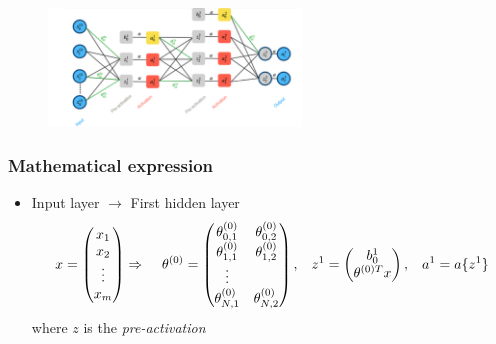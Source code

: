 \documentclass[a4paper,10pt]{article}
\begin{document}
\begin{figure}[ht]
    \centering
    \includegraphics[width =0.6\textwidth]{FNN.png}
\end{figure}

\subsubsection{Mathematical expression}
\begin{itemize}
    \item Input layer $\rightarrow$ First hidden layer
        \begin{gather*}
            x  = 
            \begin{pmatrix}
                x_{1} \\
                x_{2} \\
                \vdots \\
                x_{m} \\
            \end{pmatrix}
            \Rightarrow\hspace*{0.4cm}\theta^{(0)} = 
            \begin{pmatrix}
                \theta_{0,1}^{(0)} & \theta_{0,2}^{(0)}  \\
                \theta_{1,1}^{(0)} & \theta_{1,2}^{(0)}  \\
                \vdots \\
                \theta_{N,1}^{(0)} & \theta_{N,2}^{(0)}  \\
              \end{pmatrix}
              ,\hspace*{0.3cm}
              z^1 = 
              \begin{pmatrix}
                b_0^1 \\
                \theta^{(0)T}x \\
              \end{pmatrix}
              ,\hspace*{0.3cm}
              a^1 = a\{z^1\} 
        \end{gather*}
    where $z$ is the \textit{pre-activation}

\end{itemize}
\end{document}
